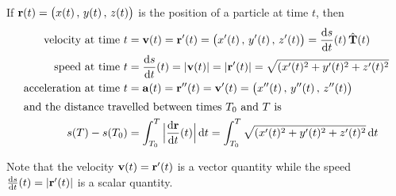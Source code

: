 \begin{lemma}\label{lem:CVvelocityEtc}
If $\mathbf{r}(t)=\big(x(t)\,,\,y(t)\,,\,z(t)\big)$ is the position of a 
particle at time $t$, then
\begin{align*}
\text{velocity at time $t$}
       &=\vv(t)=\vr'(t)=\big(x'(t)\,,\,y'(t)\,,\,z'(t)\big) 
        = \diff{s}{t}(t)\,\hat\vT(t)\\
\text{speed at time $t$}
       &= \diff{s}{t}(t)=|\vv(t)|=|\vr'(t)|=\sqrt{(x'(t)^2+y'(t)^2+z'(t)^2} \\
\text{acceleration at time $t$}
       &=\va(t)=\vr''(t)=\vv'(t)=\big(x''(t)\,,\,y''(t)\,,\,z''(t)\big) \\
\intertext{and the distance travelled between times $T_0$ and $T$ is}
  s(T)-s(T_0)&= \int_{T_0}^T \Big|\diff{\vr}{t}(t)\Big|\,\dee{t}
       = \int_{T_0}^T \sqrt{(x'(t)^2+y'(t)^2+z'(t)^2}\,\dee{t}
\end{align*}
\end{lemma}
Note that the velocity $\mathbf{v}(t) = \mathbf{r}'(t)$ is a vector quantity while the
speed $\diff{s}{t}(t)=|\vr'(t)|$ is a scalar quantity.
\goodbreak


